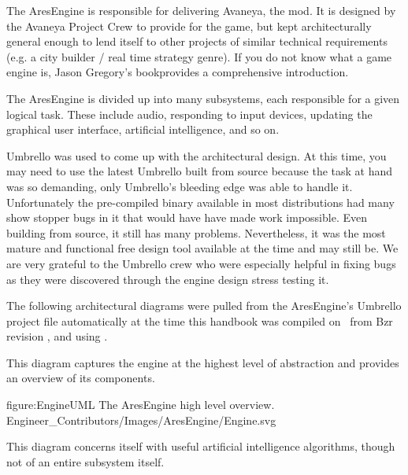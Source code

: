 

The AresEngine is responsible for delivering Avaneya, the mod. It is designed by the Avaneya Project Crew to provide for the game, but kept architecturally general enough to lend itself to other projects of similar technical requirements (e.g. a city builder / real time strategy genre). If you do not know what a game engine is, Jason Gregory's book provides a comprehensive introduction.

The AresEngine is divided up into many subsystems, each responsible for a given logical task. These include audio, responding to input devices, updating the graphical user interface, artificial intelligence, and so on.

Umbrello was used to come up with the architectural design. At this time, you may need to use the latest Umbrello built from source because the task at hand was so demanding, only Umbrello's bleeding edge was able to handle it. Unfortunately the pre-compiled binary available in most distributions had many show stopper bugs in it that would have have made work impossible. Even building from source, it still has many problems. Nevertheless, it was the most mature and functional free design tool available at the time and may still be. We are very grateful to the Umbrello crew who were especially helpful in fixing bugs as they were discovered through the engine design stress testing it.

The following architectural diagrams were pulled from the AresEngine's Umbrello project file automatically at the time this handbook was compiled on \currentdate\ from Bzr revision \BzrRevisionClickable, and using \UmbrelloVersion.

This diagram captures the engine at the highest level of abstraction and provides an overview of its components.

\FullPageDiagram
    {figure:EngineUML}
    {The AresEngine high level overview.}
    {Engineer_Contributors/Images/AresEngine/Engine.svg}

This diagram concerns itself with useful artificial intelligence algorithms, though not of an entire subsystem itself.

